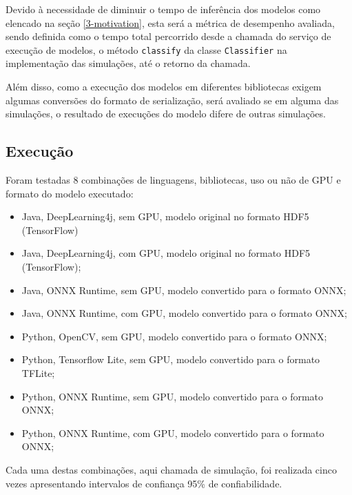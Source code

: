 Devido à necessidade de diminuir o tempo de inferência dos modelos como elencado na seção \ref{3-motivation}, esta será a métrica de desempenho avaliada, sendo definida como o tempo total percorrido desde a chamada do serviço de execução de modelos, o método \texttt{classify} da classe \texttt{Classifier} na implementação das simulações, até o retorno da chamada.

Além disso, como a execução dos modelos em diferentes bibliotecas exigem algumas conversões do formato de serialização, será avaliado se em alguma das simulações, o resultado de execuções do modelo difere de outras simulações.

\subsection{Execução}

Foram testadas 8 combinações de linguagens, bibliotecas, uso ou não de GPU e formato do modelo executado:

\begin{itemize}
  \item Java, DeepLearning4j, sem GPU, modelo original no formato HDF5 (TensorFlow)
  \item Java, DeepLearning4j, com GPU, modelo original no formato HDF5 (TensorFlow);
  \item Java, ONNX Runtime, sem GPU, modelo convertido para o formato ONNX;
  \item Java, ONNX Runtime, com GPU, modelo convertido para o formato ONNX;
  \item Python, OpenCV, sem GPU, modelo convertido para o formato ONNX;
  \item Python, Tensorflow Lite, sem GPU, modelo convertido para o formato TFLite;
  \item Python, ONNX Runtime, sem GPU, modelo convertido para o formato ONNX;
  \item Python, ONNX Runtime, com GPU, modelo convertido para o formato ONNX;
\end{itemize}

Cada uma destas combinações, aqui chamada de simulação, foi realizada cinco vezes apresentando intervalos de confiança 95\% de confiabilidade.